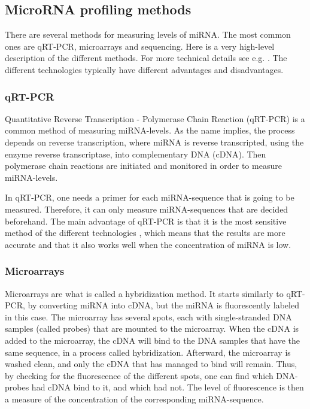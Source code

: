 \subsection{MicroRNA profiling methods}

There are several methods for measuring levels of miRNA. The most common ones are qRT-PCR, microarrays and sequencing. Here is a very high-level description of the different methods. For more technical details see e.g. \citet{mirnatech}. The different technologies typically have different advantages and disadvantages.

\subsubsection{qRT-PCR}
Quantitative Reverse Transcription - Polymerase Chain Reaction (qRT-PCR) is a common method of measuring miRNA-levels. As the name implies, the process depends on reverse transcription, where miRNA is reverse transcripted, using the enzyme reverse transcriptase, into complementary DNA (cDNA). Then polymerase chain reactions are initiated and monitored in order to measure miRNA-levels.

In qRT-PCR, one needs a primer for each miRNA-sequence that is going to be measured. Therefore, it can only measure miRNA-sequences that are decided beforehand. The main advantage of qRT-PCR is that it is the most sensitive method of the different technologies \citep{mirnatech}, which means that the results are more accurate and that it also works well when the concentration of miRNA is low. 

\subsubsection{Microarrays}
Microarrays are what is called a hybridization method. It starts similarly to qRT-PCR, by converting miRNA into cDNA, but the miRNA is fluorescently labeled in this case. The microarray has several spots, each with single-stranded DNA samples (called probes) that are mounted to the microarray. When the cDNA is added to the microarray, the cDNA will bind to the DNA samples that have the same sequence, in a process called hybridization. Afterward, the microarray is washed clean, and only the cDNA that has managed to bind will remain. Thus, by checking for the fluorescence of the different spots, one can find which DNA-probes had cDNA bind to it, and which had not. The level of fluorescence is then a measure of the concentration of the corresponding miRNA-sequence.

